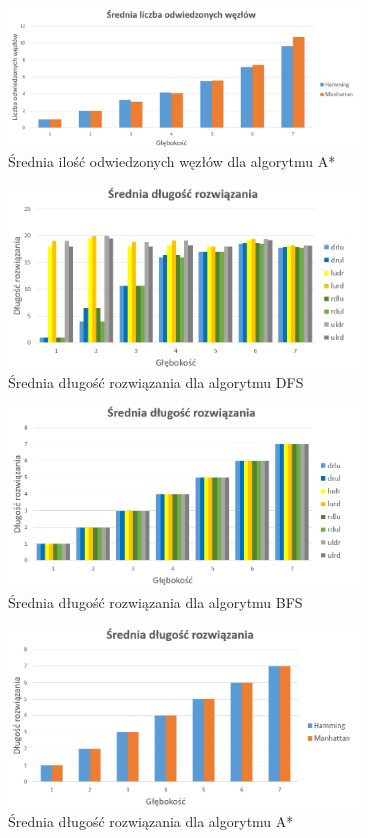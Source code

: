 \documentclass{classrep}
\begin{document}
\begin{figure}[h!]
    \centering
    \includegraphics[width=0.83\textwidth]{visitedastar.png}
    \caption{Średnia ilość odwiedzonych węzłów dla algorytmu A*}
	\label{visitedastar}
\end{figure}
\begin{figure}[h!]
    \centering
    \includegraphics[width=0.83\textwidth]{sredniaDFS.png}
    \caption{Średnia długość rozwiązania dla algorytmu DFS}
	\label{sredniaDFS}
\end{figure}
\begin{figure}[h!]
    \centering
    \includegraphics[width=0.83\textwidth]{sredniaBFS.png}
    \caption{Średnia długość rozwiązania dla algorytmu BFS}
	\label{sredniaBFS}
\end{figure}
\begin{figure}[h!]
    \centering
    \includegraphics[width=0.83\textwidth]{sredniaastr.png}
    \caption{Średnia długość rozwiązania dla algorytmu A*}
	\label{sredniaastr}
\end{figure}
\end{document}
